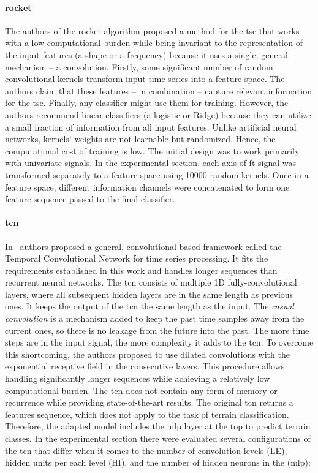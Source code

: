 \documentclass[a4paper, 10pt, twoside]{report}
\begin{document}
\paragraph{\acrfull{rocket}}
The authors of the \acrshort{rocket} algorithm proposed a method for the \acrshort{tsc} that works with a low computational burden while being invariant to the representation of the input features (\eg a shape or a frequency) because it uses a single, general mechanism -- a convolution. Firstly, some significant number of random convolutional kernels transform input time series into a feature space. The authors claim that these features -- in combination -- capture relevant information for the \acrshort{tsc}. Finally, any classifier might use them for training. However, the authors recommend linear classifiers (\eg a logistic or Ridge) because they can utilize a small fraction of information from all input features. Unlike artificial neural networks, kernels' weights are not learnable but randomized. Hence, the computational cost of training is low. The initial design was to work primarily with univariate signals. In the experimental section, each axis of \acrshort{ft} signal was transformed separately to a feature space using 10000 random kernels. Once in a feature space, different information channels were concatenated to form one feature sequence passed to the final classifier.

\paragraph{\acrfull{tcn}}
In~\cite{bai2018empirical} authors proposed a general, convolutional-based framework called the Temporal Convolutional Network for time series processing. It fits the requirements established in this work and handles longer sequences than recurrent neural networks. The \acrshort{tcn} consists of multiple 1D fully-convolutional layers, where all subsequent hidden layers are in the same length as previous ones. It keeps the output of the \acrshort{tcn} the same length as the input. The \textit{casual convolution} is a mechanism added to keep the past time samples away from the current ones, so there is no leakage from the future into the past. The more time steps are in the input signal, the more complexity it adds to the \acrshort{tcn}. To overcome this shortcoming, the authors proposed to use dilated convolutions with the exponential receptive field in the consecutive layers. This procedure allows handling significantly longer sequences while achieving a relatively low computational burden. The \acrshort{tcn} does not contain any form of memory or recurrence while providing state-of-the-art results. The original \acrshort{tcn} returns a features sequence, which does not apply to the task of terrain classification. Therefore, the adapted model includes the \acrfull{mlp} layer at the top to predict terrain classes. In the experimental section there were evaluated several configurations of the \acrshort{tcn} that differ when it comes to the number of convolution levels (LE), hidden units per each level (HI), and the number of hidden neurons in the (\acrshort{mlp}):
\end{document}
